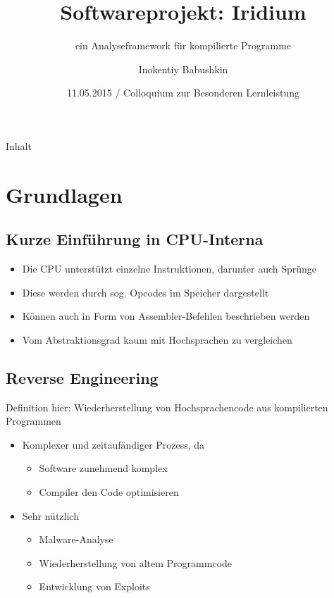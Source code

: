 \documentclass{beamer}
\title{Softwareprojekt: Iridium}
\subtitle{ein Analyseframework für kompilierte Programme}
\author{Inokentiy Babushkin}
\institute{Abteigymnasium Brauweiler}
\date{11.05.2015 / Colloquium zur Besonderen Lernleistung}
\begin{document}
\begin{frame}
  \titlepage
\end{frame}

\begin{frame}{Inhalt}
  \tableofcontents
\end{frame}

\section{Grundlagen}

\subsection{Kurze Einführung in CPU-Interna}

\begin{frame}
  \begin{itemize}
    \item Die CPU unterstützt einzelne Instruktionen, darunter auch Sprünge
    \item Diese werden durch sog. Opcodes im Speicher dargestellt
    \item Können auch in Form von Assembler-Befehlen beschrieben werden
    \item Vom Abstraktionsgrad kaum mit Hochsprachen zu vergleichen
  \end{itemize}
\end{frame}

\subsection{Reverse Engineering}

\begin{frame}{Definition hier: Wiederherstellung von Hochsprachencode aus kompilierten Programmen}
  \begin{itemize}
  \item Komplexer und zeitaufändiger Prozess, da
    \begin{itemize}
    \item Software zunehmend komplex
    \item Compiler den Code optimisieren
    \end{itemize}
  \item Sehr nützlich
    \begin{itemize}
    \item Malware-Analyse
    \item Wiederherstellung von altem Programmcode
    \item Entwicklung von Exploits
    \end{itemize}
  \end{itemize}
\end{frame}
\end{document}
